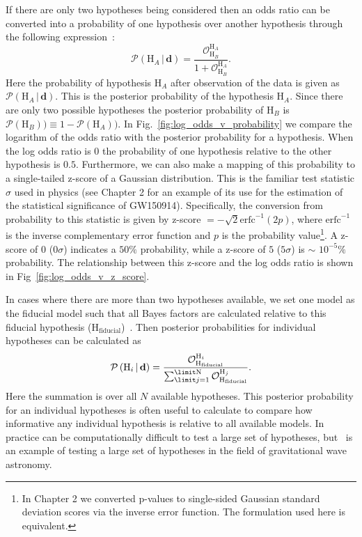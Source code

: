 If there are only two hypotheses being considered then an odds ratio can be converted into a probability of one hypothesis over another hypothesis through the following expression~\citep{read2006encyclopedia}:
\begin{equation}\label{eqn:probability_odds_ratio}
    \mathcal{P} \left(\mathrm{H}_A \, | \, \mathbf{d}\right) = \frac{\mathcal{O}^{\mathrm{H}_A}_{\mathrm{H}_B}}{1 + \mathcal{O}^{\mathrm{H}_A}_{\mathrm{H}_B}}.
\end{equation}
Here the probability of hypothesis $\mathrm{H}_A$ after observation of the data is given as $\mathcal{P}(\mathrm{H}_A \, | \, \mathbf{d})$. This is the posterior probability of the hypothesis $\mathrm{H}_A$. Since there are only two possible hypotheses the posterior probability of $\mathrm{H}_B$ is $\mathcal{P}(\mathrm{H}_B)) \equiv 1 - \mathcal{P}(\mathrm{H}_A))$. In Fig.~\ref{fig:log_odds_v_probability} we compare the logarithm of the odds ratio with the posterior probability for a hypothesis. When the log odds ratio is $0$ the probability of one hypothesis relative to the other hypothesis is $0.5$. Furthermore, we can also make a mapping of this probability to a single-tailed z-score of a Gaussian distribution. This is the familiar test statistic $\sigma$ used in physics (see Chapter 2 for an example of its use for the estimation of the statistical significance of GW150914). Specifically, the conversion from probability to this statistic is given by z-score $= -\sqrt{2} \mathrm{erfc}^{-1}(2p)$, where $\mathrm{erfc}^{-1}$ is the inverse complementary error function and $p$ is the probability value\footnote{In Chapter 2 we converted p-values to single-sided Gaussian standard deviation scores via the inverse error function. The formulation used here is equivalent.}. A z-score of $0$ ($0 \sigma$) indicates a $50\%$ probability, while a z-score of $5$ ($5 \sigma$) is $\sim$ $10^{-5}\%$ probability. The relationship between this z-score and the log odds ratio is shown in Fig~\ref{fig:log_odds_v_z_score}.

In cases where there are more than two hypotheses available, we set one model as the fiducial model such that all Bayes factors are calculated relative to this fiducial hypothesis ($\mathrm{H}_{\mathrm{fiducial}}$)~\cite{read2006encyclopedia}. Then posterior probabilities for individual hypotheses can be calculated as
\begin{equation}\label{eqn:posterior_prob_multi}
    \mathcal{P} \left(\mathrm{H}_i \, | \, \mathbf{d}\right) = \frac{\mathcal{O}^{\mathrm{H}_i}_{\mathrm{H}_{\mathrm{fiducial}}}}
                                              {\sum^{\limit \mathrm{N}}_{\limit j=1} \mathcal{O}^{\mathrm{H}_j}_{\mathrm{H}_{\mathrm{fiducial}}}}.
\end{equation}
Here the summation is over all $N$ available hypotheses. This posterior probability for an individual hypotheses is often useful to calculate to compare how informative any individual hypothesis is relative to all available models. In practice can be computationally difficult to test a large set of hypotheses, but~\cite{ligo2019model} is an example of testing a large set of hypotheses in the field of gravitational wave astronomy.

